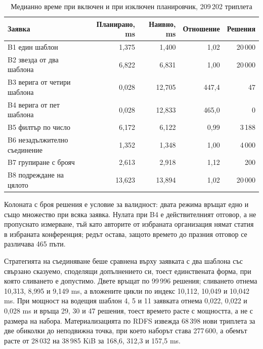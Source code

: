 \begin{table}[H]
\caption{Медианно време при включен и при изключен планировчик, 209\,202 триплета}
\label{tab:queries}
\centering
\fontsize{10}{12}\selectfont
\begin{tabular}{@{}L{5.4cm}rrrr@{}}
\toprule
\textbf{Заявка} & \textbf{Планирано, ms} & \textbf{Наивно, ms} & \textbf{Отношение} & \textbf{Решения} \\
\midrule
B1 един шаблон                & 1{,}375 & 1{,}400 & 1{,}02 & 20\,000 \\
B2 звезда от два шаблона      & 6{,}822 & 6{,}831 & 1{,}00 & 20\,000 \\
B3 верига от четири шаблона   & 0{,}028 & 12{,}705 & 447{,}4 & 47 \\
B4 верига от пет шаблона      & 0{,}028 & 12{,}833 & 465{,}0 & 0 \\
B5 филтър по число            & 6{,}172 & 6{,}122 & 0{,}99 & 3\,188 \\
B6 незадължително съединение  & 1{,}352 & 1{,}348 & 1{,}00 & 4\,000 \\
B7 групиране с брояч          & 2{,}613 & 2{,}918 & 1{,}12 & 200 \\
B8 подреждане на цялото       & 13{,}623 & 13{,}894 & 1{,}02 & 20\,000 \\
\bottomrule
\end{tabular}
\end{table}

Колоната с броя решения  е условие за валидност: двата режима връщат едно и
също множество при всяка заявка. Нулата при B4 е действителният отговор, а не пропуснато измерване, тъй като
авторите от избраната организация нямат статия в избраната конференция; редът остава, защото
времето до празния отговор се различава 465 пъти.

Стратегията на съединяване беше сравнена върху заявката с два шаблона със свързано сказуемо,
споделящи допълнението си, тоест единствената форма, при която сливането е допустимо. Двете
връщат по 99\,996 решения; сливането отнема 10{,}313, 8{,}995 и 9{,}149 ms, а вложените цикли
по индекс 10{,}112, 10{,}049 и 10{,}042 ms. При мощност на водещия шаблон 4, 5 и 11 заявката
отнема 0{,}022, 0{,}022 и 0{,}028 ms и връща 29, 30 и 47 решения, тоест времето расте с
мощността, а не с размера на набора. Материализацията по RDFS извежда 68\,398 нови триплета за
две обиколки до неподвижна точка, при което наборът става 277\,600, а обемът расте от 28\,032
на 38\,985 KiB за 168{,}6, 312{,}3 и 157{,}5 ms.

